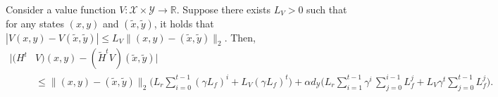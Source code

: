 \documentclass[10pt,a4paper]{amsart}
\begin{document}
\begin{lemma}
    \label{lemma:HV_H'V}
    Consider a value function $V:\mathcal X \times \mathcal Y \rightarrow \mathbb R$. Suppose there exists $L_V>0$ such that for any states $(x,y)$ and $(\tilde{x},\tilde{y})$, it holds that $
    |V(x,y) - V(\tilde{x},\tilde{y})| \leq L_V \|(x,y) - (\tilde{x},\tilde{y})\|_2$.
    Then,
    \begin{align*}
       \bigl | (H^t &V)(x,y) - (\tilde{H}^t V) (\tilde{x},\tilde{y}) \bigr | \\
       &\leq \bigl\|(x,y)-(\tilde{x}, \tilde{y}) \bigl\|_2 \biggl(L_r \sum_{i=0}^{t-1} (\gamma L_f)^i + L_V (\gamma L_f)^t\biggr) + \alpha d_\mathcal{Y} \biggl( L_r \sum_{i=1}^{t-1} \gamma^i \, \sum_{j=0}^{i-1} L_f^j  + L_V \gamma^t \sum_{j=0}^{t-1} L_f^j \biggr).
    \end{align*}
\end{lemma}
\end{document}
